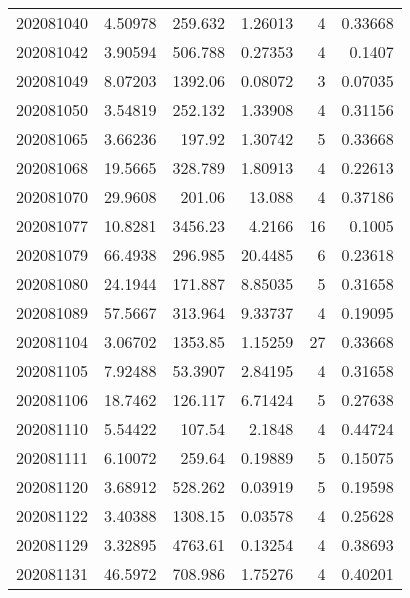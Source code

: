 \begin{tabular}{rrrrrr}
 202081040 &          4.50978 &      259.632  &            1.26013 &           4 & 0.33668 \\
 202081042 &          3.90594 &      506.788  &            0.27353 &           4 & 0.1407  \\
 202081049 &          8.07203 &     1392.06   &            0.08072 &           3 & 0.07035 \\
 202081050 &          3.54819 &      252.132  &            1.33908 &           4 & 0.31156 \\
 202081065 &          3.66236 &      197.92   &            1.30742 &           5 & 0.33668 \\
 202081068 &         19.5665  &      328.789  &            1.80913 &           4 & 0.22613 \\
 202081070 &         29.9608  &      201.06   &           13.088   &           4 & 0.37186 \\
 202081077 &         10.8281  &     3456.23   &            4.2166  &          16 & 0.1005  \\
 202081079 &         66.4938  &      296.985  &           20.4485  &           6 & 0.23618 \\
 202081080 &         24.1944  &      171.887  &            8.85035 &           5 & 0.31658 \\
 202081089 &         57.5667  &      313.964  &            9.33737 &           4 & 0.19095 \\
 202081104 &          3.06702 &     1353.85   &            1.15259 &          27 & 0.33668 \\
 202081105 &          7.92488 &       53.3907 &            2.84195 &           4 & 0.31658 \\
 202081106 &         18.7462  &      126.117  &            6.71424 &           5 & 0.27638 \\
 202081110 &          5.54422 &      107.54   &            2.1848  &           4 & 0.44724 \\
 202081111 &          6.10072 &      259.64   &            0.19889 &           5 & 0.15075 \\
 202081120 &          3.68912 &      528.262  &            0.03919 &           5 & 0.19598 \\
 202081122 &          3.40388 &     1308.15   &            0.03578 &           4 & 0.25628 \\
 202081129 &          3.32895 &     4763.61   &            0.13254 &           4 & 0.38693 \\
 202081131 &         46.5972  &      708.986  &            1.75276 &           4 & 0.40201 \\

\end{tabular}
